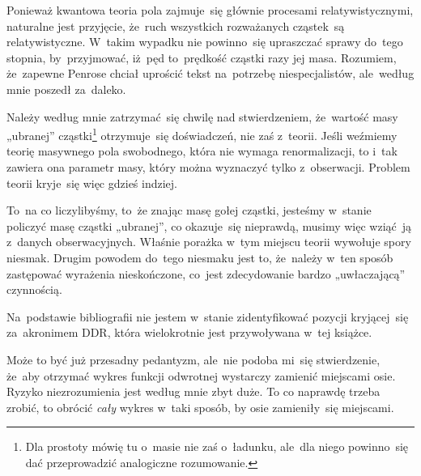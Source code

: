 \documentclass[a4paper,11pt]{article}
\numberwithin{equation}{section}
\begin{document}
\vspace{0em}



\vspace{0em}


\noindent
{} Ponieważ kwantowa teoria pola zajmuje~się
głównie procesami relatywistycznymi, naturalne jest przyjęcie, że~ruch
wszystkich rozważanych cząstek~są relatywistyczne. W~takim wypadku nie
powinno~się upraszczać sprawy do~tego stopnia, by~przyjmować, iż~pęd
to~prędkość cząstki razy jej masa. Rozumiem, że~zapewne Penrose chciał
uprościć tekst na~potrzebę niespecjalistów, ale~według mnie poszedł
za~daleko.

\VerSpaceFour





\noindent
{} Należy według mnie zatrzymać~się chwilę nad
stwierdzeniem, że~wartość masy „ubranej” cząstki\footnote{Dla
  prostoty mówię tu o~masie nie zaś o~ładunku, ale~dla niego
  powinno~się dać przeprowadzić analogiczne rozumowanie.}
otrzymuje~się doświadczeń, nie zaś z~teorii. Jeśli weźmiemy teorię
masywnego pola swobodnego, która nie wymaga renormalizacji, to i~tak
zawiera ona parametr masy, który można wyznaczyć tylko z~obserwacji.
Problem teorii kryje~się więc gdzieś indziej.

To~na co liczylibyśmy, to~że znając masę gołej cząstki, jesteśmy
w~stanie policzyć masę cząstki „ubranej”, co okazuje~się nieprawdą,
musimy więc wziąć~ją z~danych obserwacyjnych. Właśnie porażka w~tym
miejscu teorii wywołuje spory niesmak. Drugim powodem do~tego niesmaku
jest to, że~należy w~ten sposób zastępować wyrażenia nieskończone,
co~jest zdecydowanie bardzo „uwłaczającą” czynnością.

\VerSpaceFour





\noindent
{} Na~podstawie bibliografii nie jestem w~stanie
zidentyfikować pozycji kryjącej~się za~akronimem DDR, która
wielokrotnie jest przywoływana w~tej książce.

\VerSpaceFour





\noindent
{} Może to być już przesadny pedantyzm, ale~nie podoba
mi~się stwierdzenie, że~aby otrzymać wykres funkcji odwrotnej
wystarczy zamienić miejscami osie. Ryzyko niezrozumienia jest według
mnie zbyt duże. To co naprawdę trzeba zrobić, to obrócić \textit{cały}
wykres w~taki sposób, by osie zamieniły~się miejscami.
\end{document}
